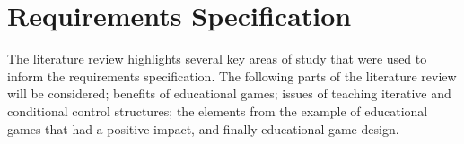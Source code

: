 \documentclass[a4paper,11.5pt]{report}
\numberwithin{figure}{section}
\numberwithin{table}{section}
\numberwithin{equation}{section}
\numberwithin{equation}{section}
\newcommand\blankpage{%
    \null
    \thispagestyle{empty}%
    \addtocounter{page}{-1}%
    \newpage}
\begin{document}


\afterpage{\blankpage}





\chapter{Requirements Specification}


The literature review highlights several key areas of study that were used to inform the requirements specification. The following parts of the literature review will be considered; benefits of educational games; issues of teaching iterative and conditional control structures; the elements from the example of educational games that had a positive impact, and finally educational game design.
\end{document}
